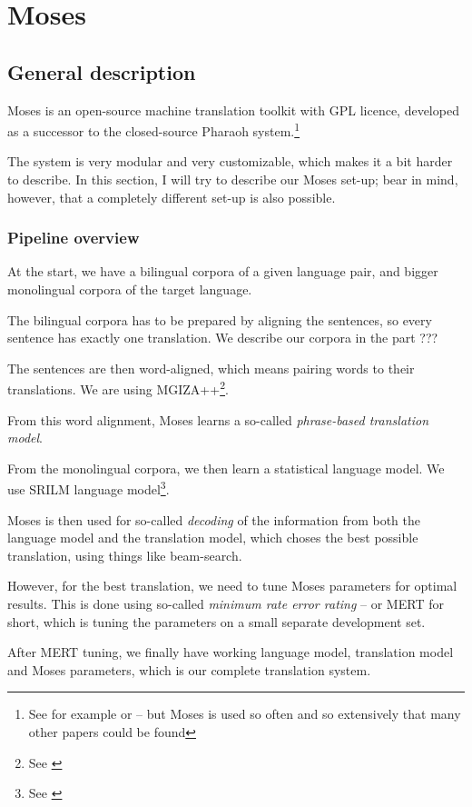 \chapter{Moses}

\section{General description}
Moses is an open-source machine translation toolkit with GPL licence, developed as a successor to the closed-source Pharaoh system.\footnote{See for example \cite{mosespaper} or \cite{moseslink} -- but Moses is used so often and so extensively that many other papers could be found}

The system is very modular and very customizable, which makes it a bit harder to describe. In this section, I will try to describe our Moses set-up; bear in mind, however, that a completely different set-up is also possible.


\subsection{Pipeline overview}
At the start, we have a bilingual corpora of a given language pair, and bigger monolingual corpora of the target language.

The bilingual corpora has to be prepared by aligning the sentences, so every sentence has exactly one translation. We describe our corpora in the part ???

The sentences are then word-aligned, which means pairing words to their translations. We are using MGIZA++\footnote{See \cite{mgiza}}.

From this word alignment, Moses learns a so-called \emph{phrase-based translation model}.

From the monolingual corpora, we then learn a statistical language model. We use SRILM language model\footnote{See \cite{srilm}}.

Moses is then used for so-called \emph{decoding} of the information from both the language model and the translation model, which choses the best possible translation, using things like beam-search.

However, for the best translation, we need to tune Moses parameters for optimal results. This is done using so-called \emph{minimum rate error rating} -- or MERT for short, which is tuning the parameters on a small separate development set.

After MERT tuning, we finally have working language model, translation model and Moses parameters, which is our complete translation system.

